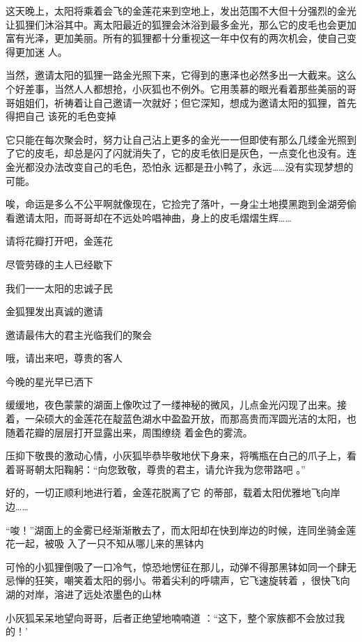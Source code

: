 \documentclass{article}
\begin{document}
这天晚上，太阳将乘着会飞的金莲花来到空地上，发出范围不大但十分强烈的金光让狐狸们沐浴其中。离太阳最近的狐狸会沐浴到最多金光，那么它的皮毛也会更加富有光泽，更加美丽。所有的狐狸都十分重视这一年中仅有的两次机会，使自己变得更加迷
人。 

\newpage

当然，邀请太阳的狐狸一路金光照下来，它得到的惠泽也必然多出一大截来。这么个好差事，当然人人都想抢，小灰狐也不例外。它用羡慕的眼光看着那些美丽的哥哥姐姐们，祈祷着让自己邀请一次就好；但它深知，想成为邀请太阳的狐狸，首先得把自己
该死的毛色变掉 

它只能在每次聚会时，努力让自己沾上更多的金光一一但即使有那么几缕金光照到了它的皮毛，却总是闪了闪就消失了，它的皮毛依旧是灰色，一点变化也没有。连金光都没办法改变自己的毛色，恐怕永
远都是丑小鸭了，永远……没有实现梦想的可能。 

唉，命运是多么不公平啊就像现在，它捡完了落叶，一身尘土地摸黑跑到金湖旁偷看邀请太阳，而哥哥却在不远处吟唱神曲，身上的皮毛熠熠生辉……


请将花瓣打开吧，金莲花 


尽管劳碌的主人已经歇下 

\newpage


我们一一太阳的忠诚子民 


金狐狸发出真诚的邀请 


邀请最伟大的君主光临我们的聚会 


哦，请出来吧，尊贵的客人 


今晚的星光早已洒下 

缓缓地，夜色蒙蒙的湖面上像吹过了一缕神秘的微风，儿点金光闪现了出来。接着，一朵硕大的金莲花在靛蓝色湖水中盈盈开放，而那高贵而浑圆光洁的太阳，也随着花瓣的层层打开显露出来，周围缭绕
着金色的雾流。 

压抑下敬畏的激动心情，小灰狐毕恭毕敬地伏下身来，将嘴瓶在白己的爪子上，看着哥哥朝太阳鞠躬：“向您致敬，尊贵的君主，请允许我为您带路吧
。” 

\newpage

好的，一切正顺利地进行着，金莲花脱离了它
的蒂部，载着太阳优雅地飞向岸边…… 

“唆！”湖面上的金雾已经渐渐散去了，而太阳却在快到岸边的时候，连同坐骑金莲花一起，被吸
入了一只不知从哪儿来的黑钵内 

可怜的小狐狸倒吸了一口冷气，惊恐地愣征在那儿，动弹不得那黑钵如同一个肆无忌惮的狂笑，嘲笑着太阳的弱小。带着尖利的呼啸声，它飞速旋转着
，很快飞向湖的对岸，溶进了远处浓墨色的山林 

小灰狐呆呆地望向哥哥，后者正绝望地喃喃道
：“这下，整个家族都不会放过我的！’ 
\end{document}
